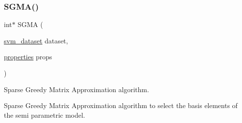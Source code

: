 \subsubsection{\texorpdfstring{S\+G\+M\+A()}{SGMA()}}
{\ttfamily int$\ast$ S\+G\+MA (\begin{DoxyParamCaption}\item[{\hyperlink{structsvm__dataset}{svm\+\_\+dataset}}]{dataset,  }\item[{\hyperlink{structproperties}{properties}}]{props }\end{DoxyParamCaption})}



Sparse Greedy Matrix Approximation algorithm. 

Sparse Greedy Matrix Approximation algorithm to select the basis elements of the semi parametric model. 